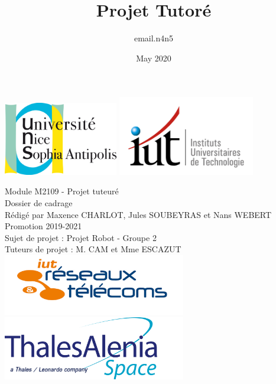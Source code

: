\documentclass{PackagerQualityN}
\title{Projet Tutoré}
\author{email.n4n5 }
\date{May 2020}
\begin{document}
\begin{titlepage}%


\includegraphics[width=5cm]{img/logoUniv.png}
\hfill
\includegraphics[width=6cm]{img/logoIUT.jpg}


\begin{center}
\Huge
Module M2109 - Projet tuteuré\\
Dossier de cadrage
\\
\vspace{1cm}
\vspace{1cm}
\large
Rédigé par Maxence CHARLOT, Jules SOUBEYRAS et Nans WEBERT\\
Promotion 2019-2021\\
\vspace{3.5cm}
Sujet de projet : Projet Robot - Groupe 2\\
Tuteurs de projet : M. CAM et Mme ESCAZUT\\
\vspace{1cm}
\includegraphics[width=8cm]{img/logoRetT.png}
\hfill
\includegraphics[width=8cm]{img/logoThales.png}

\end{center}


\end{titlepage}
\end{document}
